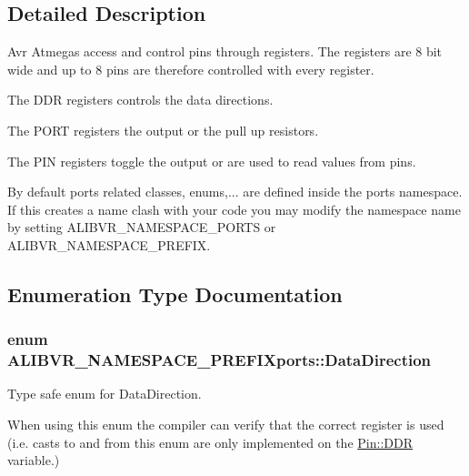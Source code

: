 \subsection{Detailed Description}
Avr Atmegas access and control pins through registers. The registers are 8 bit wide and up to 8 pins are therefore controlled with every register. 


\begin{DoxyItemize}
\item The D\+DR registers controls the data directions.
\item The P\+O\+RT registers the output or the pull up resistors.
\item The P\+IN registers toggle the output or are used to read values from pins.
\end{DoxyItemize}

By default ports related classes, enums,... are defined inside the {\ttfamily ports} namespace. If this creates a name clash with your code you may modify the namespace name by setting A\+L\+I\+B\+V\+R\+\_\+\+N\+A\+M\+E\+S\+P\+A\+C\+E\+\_\+\+P\+O\+R\+TS or A\+L\+I\+B\+V\+R\+\_\+\+N\+A\+M\+E\+S\+P\+A\+C\+E\+\_\+\+P\+R\+E\+F\+IX. 

\subsection{Enumeration Type Documentation}
\subsubsection[{\texorpdfstring{Data\+Direction}{DataDirection}}]{\setlength{\rightskip}{0pt plus 5cm}enum {\bf A\+L\+I\+B\+V\+R\+\_\+\+N\+A\+M\+E\+S\+P\+A\+C\+E\+\_\+\+P\+R\+E\+F\+I\+Xports\+::\+Data\+Direction}\hspace{0.3cm}{\ttfamily [strong]}}\hypertarget{namespaceALIBVR__NAMESPACE__PREFIXports_a726f0120b8d4e0856e47f3daf19bd725}{}\label{namespaceALIBVR__NAMESPACE__PREFIXports_a726f0120b8d4e0856e47f3daf19bd725}


Type safe enum for Data\+Direction. 

When using this enum the compiler can verify that the correct register is used (i.\+e. casts to and from this enum are only implemented on the \hyperlink{structALIBVR__NAMESPACE__PREFIXports_1_1Pin_a7a8fd2de2412fd6b900c5f65249ac77b}{Pin\+::\+D\+DR} variable.)

